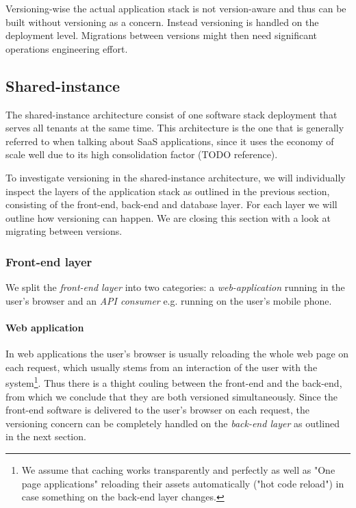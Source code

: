 Versioning-wise the actual application stack is not version-aware and thus can be built without versioning as a concern. Instead versioning is handled on the deployment level. Migrations between versions might then need significant operations engineering effort.

\subsection{Shared-instance}

The shared-instance architecture consist of one software stack deployment that serves all tenants at the same time. This architecture is the one that is generally referred to when talking about SaaS applications, since it uses the economy of scale well due to its high consolidation factor (TODO reference).

To investigate versioning in the shared-instance architecture, we will individually inspect the layers of the application stack as outlined in the previous section, consisting of the front-end, back-end and database layer. For each layer we will outline how versioning can happen. We are closing this section with a look at migrating between versions.

\subsubsection{Front-end layer}
\label{sec:sharedfrontend}

We split the \emph{front-end layer} into two categories: a \emph{web-application} running in the user's browser and an \emph{API consumer} e.g. running on the user's mobile phone.

\paragraph{Web application} In web applications the user's browser is usually reloading the whole web page on each request, which usually stems from an interaction of the user with the system\footnote{We assume that caching works transparently and perfectly as well as "One page applications" reloading their assets automatically ("hot code reload") in case something on the back-end layer changes.}. Thus there is a thight couling between the front-end and the back-end, from which we conclude that they are both versioned simultaneously. Since the front-end software is delivered to the user's browser on each request, the versioning concern can be completely handled on the \emph{back-end layer} as outlined in the next section.

